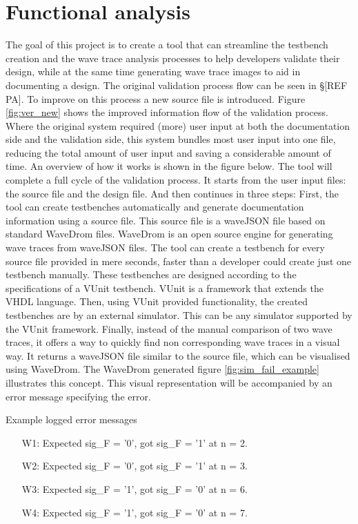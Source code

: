 \chapter{Functional analysis} \label{FA}
The goal of this project is to create a tool that can streamline the testbench creation and the wave trace analysis processes to help developers validate their design, while at the same time generating wave trace images to aid in documenting a design. The original validation process flow can be seen in §[REF PA]. To improve on this process a new source file is introduced. Figure \ref{fig:ver_new} shows the improved information flow of the validation process. Where the original system required (more) user input at both the documentation side and the validation side, this system bundles most user input into one file, reducing the total amount of user input and saving a considerable amount of time. An overview of how it works is shown in the figure below.%
\newpage
{}\noindent
The tool will complete a full cycle of the validation process. It starts from the user input files: the source file and the design file. And then continues in three steps:
\npar
First, the tool can create testbenches automatically and generate documentation information using a source file. This source file is a waveJSON \cite{wavejson} file based on standard WaveDrom \cite{wavedrom} files. WaveDrom is an open source engine for generating wave traces from waveJSON files. The tool can create a testbench for every source file provided in mere seconds, faster than a developer could create just one testbench manually. These testbenches are designed according to the specifications of a VUnit \cite{vunit} testbench. VUnit is a framework that extends the VHDL language.\newpage
\npar
Then, using VUnit provided functionality, the created testbenches are by an external simulator. This can be any simulator supported by the VUnit framework.
\npar
Finally, instead of the manual comparison of two wave traces, it offers a way to quickly find non corresponding wave traces in a visual way. It returns a waveJSON file similar to the source file, which can be visualised using WaveDrom. The WaveDrom generated figure \ref{fig:sim_fail_example} illustrates this concept. This visual representation will be accompanied by an error message specifying the error.%
\begin{customenv}
	\caption{Example logged error messages}\label{log:example}
	\begin{itemize}
		\centering
		\item [W1:] Expected sig\_F =  '0',  got sig\_F =  '1' at n = 2.
		\item [W2:] Expected sig\_F =  '0',  got sig\_F =  '1' at n = 3.
		\item [W3:] Expected sig\_F =  '1',  got sig\_F =  '0' at n = 6.
		\item [W4:] Expected sig\_F =  '1',  got sig\_F =  '0' at n = 7.
	\end{itemize}
\end{customenv}\newpage\noindent
